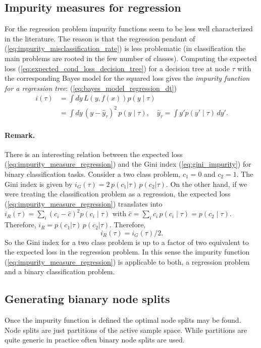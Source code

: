 \documentclass[12pt,a4paper]{article}
\begin{document}
\subsection{Impurity measures for regression}
For the regression problem  impurity functions seem to be less well characterized in the literature. The reason is that the regression pendant of (\ref{eq:impurity_misclassification_rate})  is less problematic (in classification the main problems are rooted in the few number of classes). Computing the expected loss (\ref{eq:expected_cond_loss_decision_tree}) for a decision tree at node $\tau$ with the corresponding Bayes model for the squared loss gives the \textit{impurity function for a regression tree}:
(\ref{eq:bayes_model_regression_dt})
\begin{align} 
	i(\tau) & = \int dy\,L(y, f(x)) p(y \mid \tau) \nonumber \\
	 & =  \int dy\,(y -  \hat y_\tau)^2 \, p(y \mid \tau), \quad \hat y_\tau=\int  y' p(y' \mid \tau)\, dy'. \label{eq:impurity_measure_regression}
\end{align}
\paragraph{Remark.} There is an interesting relation between the expected loss (\ref{eq:impurity_measure_regression}) and the Gini index (\ref{eq:gini_impurity}) for binary classification tasks. Consider a two class problem, $c_1=0$ and $c_2=1$. The Gini index is given by $i_G(\tau) = 2\, p(c_1|\tau)\, p(c_2|\tau)$. On the other hand, if we were treating the classification problem as a regression, the expected loss (\ref{eq:impurity_measure_regression}) translates into $i_R(\tau) = \sum_i (c_i -\hat c)^2 p(c_i\mid \tau)$ with $\hat c = \sum_i c_i\,p(c_i \mid \tau) = p(c_2\mid \tau)$. Therefore, $i_R =  p(c_1|\tau)\, p(c_2|\tau)$. Therefore, 
$$i_R(\tau) = i_G(\tau) / 2.$$ So the Gini index for a two class problem is up to a factor of two equivalent to the expected loss in the regression problem.  In this sense the impurity function (\ref{eq:impurity_measure_regression}) is applicable to both, a regression problem and a binary classification problem. 

\subsection{Generating bianary node splits}
Once the impurity function is defined the optimal node splits may be found. Node splits are just partitions of the active sample space. While partitions are quite generic in practice often binary node splits are used. 
\end{document}
